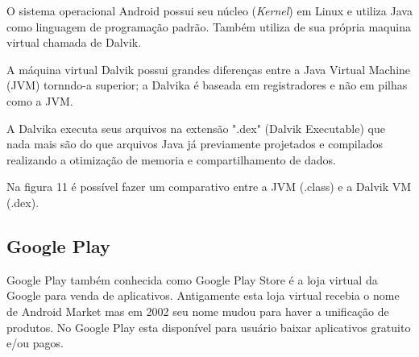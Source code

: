 O sistema operacional Android possui seu núcleo (\textit{Kernel}) em Linux e utiliza Java como linguagem de programação padrão. Também utiliza de sua própria maquina virtual chamada de Dalvik.

A máquina virtual Dalvik possui grandes diferenças entre a Java Virtual Machine (JVM) tornndo-a superior; a Dalvika é baseada em registradores e não em pilhas como a JVM.

A Dalvika executa seus arquivos na extensão ".dex" (Dalvik Executable) que nada mais são do que arquivos Java já previamente projetados e compilados realizando a otimização de memoria e compartilhamento de dados.

Na figura 11 é possível fazer um comparativo entre a JVM (.class) e a Dalvik VM (.dex). \cite{desa}

\pagebreak
\begin{figure}[h!]
		\centering
	\end{figure}

\subsection{Google Play }

Google Play também conhecida como Google Play Store é a loja virtual da Google para venda de aplicativos. Antigamente esta loja virtual recebia o nome de Android Market mas em 2002 seu nome mudou para haver a unificação de produtos.
No Google Play esta disponível para usuário baixar aplicativos gratuito e/ou pagos. \cite{gp}

